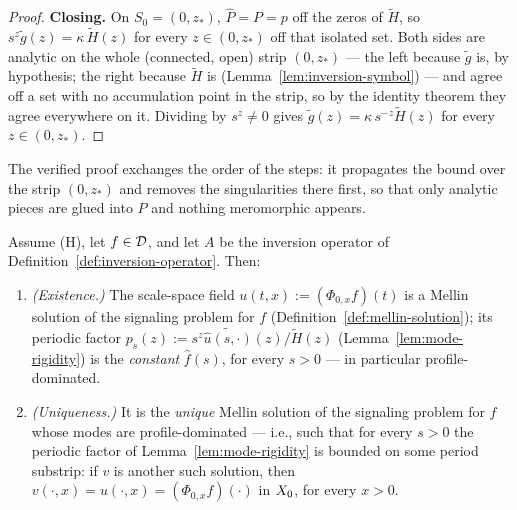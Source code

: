 \begin{proof}
\textbf{Closing.} On $S_0 = (0,z_*)$, $\hat P = P = p$ off the zeros of $\tilde H$, so
$s^z\tilde g(z) = \kappa\,\tilde H(z)$ for every $z \in (0,z_*)$ off that isolated set. Both sides
are analytic on the whole (connected, open) strip $(0,z_*)$ --- the left because $\tilde g$ is, by
hypothesis; the right because $\tilde H$ is (Lemma~\ref{lem:inversion-symbol}) --- and agree off a
set with no accumulation point in the strip, so by the identity theorem they agree everywhere on
it. Dividing by $s^z \ne 0$ gives $\tilde g(z) = \kappa\,s^{-z}\tilde H(z)$ for every
$z \in (0,z_*)$.
\end{proof}

The verified proof exchanges the order of the steps: it propagates the bound over the strip
$(0,z_*)$ and removes the singularities there first, so that only analytic pieces are glued
into $P$ and nothing meromorphic appears.

\begin{corollary}\label{cor:signaling-wellposed}
Assume (H), let $f \in \mathcal{D}$, and let $A$ be the inversion operator of
Definition~\ref{def:inversion-operator}. Then:
\begin{enumerate}
\item \emph{(Existence.)} The scale-space field $u(t,x) := (\Phi_{0,x}f)(t)$ is a Mellin solution
of the signaling problem for $f$ (Definition~\ref{def:mellin-solution}); its periodic factor
$p_s(z) := s^z\widetilde{\hat u(s,\cdot)}(z)/\tilde H(z)$ (Lemma~\ref{lem:mode-rigidity}) is the
\emph{constant} $\hat f(s)$, for every $s > 0$ --- in particular profile-dominated.
\item \emph{(Uniqueness.)} It is the \emph{unique} Mellin solution of the signaling problem for
$f$ whose modes are profile-dominated --- i.e., such that for every $s > 0$ the periodic factor of
Lemma~\ref{lem:mode-rigidity} is bounded on some period substrip: if $v$ is another such solution,
then $v(\cdot,x) = u(\cdot,x) = (\Phi_{0,x}f)(\cdot)$ in $X_0$, for every $x > 0$.
\end{enumerate}
\end{corollary}

